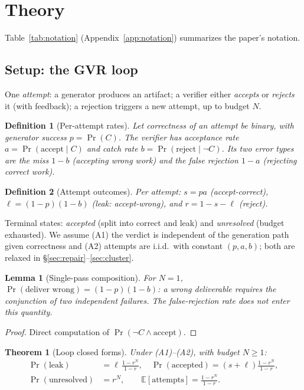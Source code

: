 \documentclass[10pt]{article}
\newtheorem{theorem}{Theorem}
\newtheorem{lemma}{Lemma}
\newtheorem{definition}{Definition}
\begin{document}
\section{Theory}\label{sec:theory}

Table~\ref{tab:notation} (Appendix~\ref{app:notation}) summarizes
the paper's notation.

\subsection{Setup: the GVR loop}\label{sec:setup}

One \emph{attempt}: a generator produces an artifact; a verifier
either \emph{accepts} or \emph{rejects} it (with feedback); a
rejection triggers a new attempt, up to budget $N$.

\begin{definition}[Per-attempt rates]\label{def:rates}
Let correctness of an attempt be binary, with generator success
$p = \Pr(C)$.  The verifier has acceptance rate
$a = \Pr(\text{accept} \mid C)$ and catch rate
$b = \Pr(\text{reject} \mid \neg C)$.  Its two error types are the
\emph{miss} $1-b$ (accepting wrong work) and the \emph{false
rejection} $1-a$ (rejecting correct work).
\end{definition}

\begin{definition}[Attempt outcomes]\label{def:outcomes}
Per attempt: $s = pa$ (accept-correct),
$\ell = (1-p)(1-b)$ (\emph{leak}: accept-wrong), and
$r = 1 - s - \ell$ (reject).
\end{definition}

Terminal states: \emph{accepted} (split into correct and leak) and
\emph{unresolved} (budget exhausted).  We assume (A1) the verdict is
independent of the generation path given correctness and (A2)
attempts are i.i.d.\ with constant $(p,a,b)$; both are relaxed in
§\ref{sec:repair}--\ref{sec:cluster}.

\begin{lemma}[Single-pass composition]\label{lem:single}
For $N=1$, $\Pr(\text{deliver wrong}) = (1-p)(1-b)$: a wrong
deliverable requires the conjunction of two independent failures.
The false-rejection rate does not enter this quantity.
\end{lemma}

\begin{proof}
Direct computation of $\Pr(\neg C \wedge \text{accept})$.
\end{proof}

\begin{theorem}[Loop closed forms]\label{thm:loop}
Under (A1)--(A2), with budget $N \ge 1$:
\begin{align}
\Pr(\text{leak}) &= \ell\,\frac{1-r^N}{1-r}, \quad
\Pr(\text{accepted}) = (s+\ell)\frac{1-r^N}{1-r},\\
\Pr(\text{unresolved}) &= r^N, \qquad
\mathbb{E}[\text{attempts}] = \frac{1-r^N}{1-r}.
\end{align}
\end{theorem}
\end{document}
